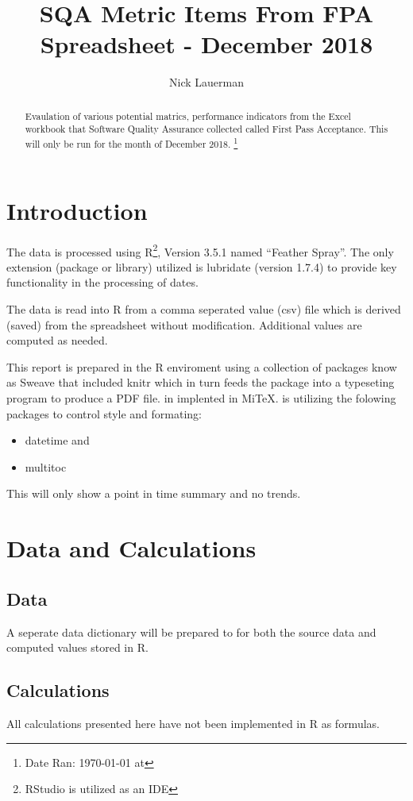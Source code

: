 \documentclass{article}
\title{SQA Metric Items From FPA Spreadsheet - December 2018}
\author{Nick Lauerman}
\date{}
\begin{document}

\maketitle

\begin{abstract}
Evaulation of various potential matrics, performance indicators from the Excel
workbook that Software Quality Assurance collected called First Pass
Acceptance. This will only be run for the month of December 2018.
\footnote{Date Ran: \today{} at \currenttime}
\end{abstract}

\tableofcontents

\section{Introduction}
The data is processed using R\footnote{RStudio is utilized as an IDE}, Version
3.5.1 named ``Feather Spray''. The only extension (package or library) utilized is
lubridate (version 1.7.4) to provide key functionality in the processing of dates.

The data is read into R from a comma seperated value (csv) file which is derived (saved)
from the spreadsheet without modification. Additional values are computed as needed.

This report is prepared in the R enviroment using a collection of packages know as
Sweave that included knitr which in turn feeds the package into \LaTeXe{} a typeseting
program to produce a PDF file. \LaTeXe{} in implented in Mi\TeX. \LaTeXe{} is utilizing
the folowing packages to control style and formating:
\begin{itemize}
\item datetime and
\item multitoc
\end{itemize}

This will only show a point in time summary and no trends.

\section{Data and Calculations}
\subsection{Data}
A seperate data dictionary will be prepared to for both the source data
and computed values stored in R.

\subsection{Calculations}
All calculations presented here have not been implemented in R as formulas.
\end{document}
